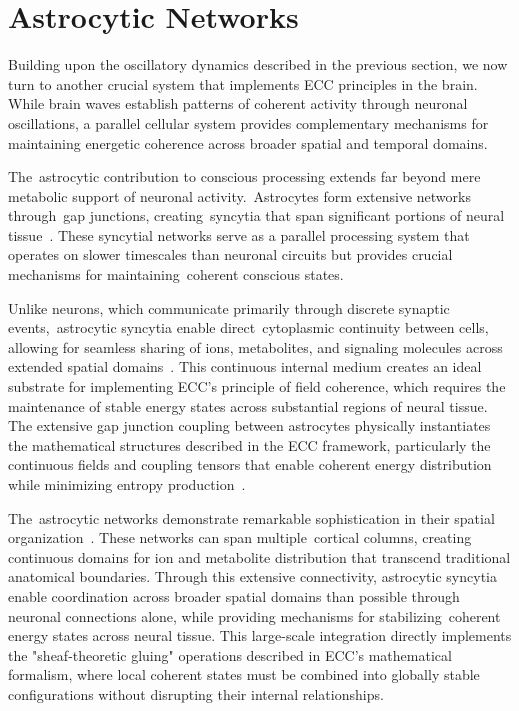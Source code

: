 \section{Astrocytic Networks~}

Building upon the oscillatory dynamics described in the previous section, we now turn to another crucial system that implements ECC principles in the brain. While brain waves establish patterns of coherent activity through neuronal oscillations, a parallel cellular system provides complementary mechanisms for maintaining energetic coherence across broader spatial and temporal domains.

The~astrocytic contribution to conscious processing extends far beyond mere metabolic support of neuronal activity.~Astrocytes form extensive networks through~gap junctions, creating~syncytia that span significant portions of neural tissue~\cite{Giaume2010, Nagy2018}. These syncytial networks serve as a parallel processing system that operates on slower timescales than neuronal circuits but provides crucial mechanisms for maintaining~coherent conscious states.

Unlike neurons, which communicate primarily through discrete synaptic events,~astrocytic syncytia enable direct~cytoplasmic continuity between cells, allowing for seamless sharing of ions, metabolites, and signaling molecules across extended spatial domains~\cite{Nagy2000, Giaume1996}. This continuous internal medium creates an ideal substrate for implementing ECC's principle of field coherence, which requires the maintenance of stable energy states across substantial regions of neural tissue. The extensive gap junction coupling between astrocytes physically instantiates the mathematical structures described in the ECC framework, particularly the continuous fields and coupling tensors that enable coherent energy distribution while minimizing entropy production~\cite{breakspear2005dynamics, Friston2010}.

The~astrocytic networks demonstrate remarkable sophistication in their spatial organization~\cite{Oberheim2012, Verkhratsky2018}. These networks can span multiple~cortical columns, creating continuous domains for ion and metabolite distribution that transcend traditional anatomical boundaries. Through this extensive connectivity, astrocytic syncytia enable coordination across broader spatial domains than possible through neuronal connections alone, while providing mechanisms for stabilizing~coherent energy states across neural tissue. This large-scale integration directly implements the "sheaf-theoretic gluing" operations described in ECC's mathematical formalism, where local coherent states must be combined into globally stable configurations without disrupting their internal relationships.

